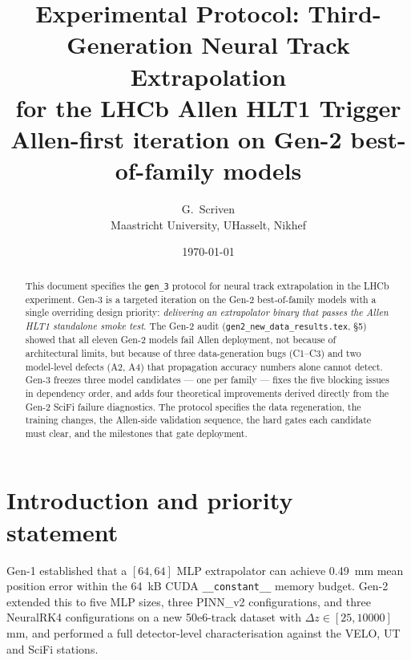 \documentclass[a4paper,11pt]{article}
\newcommand{\SI}[2]{#1~#2}
\newcommand{\num}[1]{#1}
\newcommand{\kilo}{k}
\newcommand{\byte}{B}
\newcommand{\mm}{mm}
\newcommand{\dz}{\Delta z}
\begin{document}
\title{Experimental Protocol: Third-Generation Neural Track Extrapolation\\
for the LHCb Allen HLT1 Trigger\\
\large Allen-first iteration on Gen-2 best-of-family models}

\author{G.~Scriven\\\small Maastricht University, UHasselt, Nikhef}
\date{\today}

\begin{abstract}
This document specifies the \texttt{gen\_3} protocol for neural track
extrapolation in the LHCb experiment.  Gen-3 is a targeted iteration on
the Gen-2 best-of-family models with a single overriding design
priority: \emph{delivering an extrapolator binary that passes the Allen
HLT1 standalone smoke test}.  The Gen-2 audit
(\texttt{gen2\_new\_data\_results.tex}, §5) showed that all eleven
Gen-2 models fail Allen deployment, not because of architectural
limits, but because of three data-generation bugs (C1--C3) and two
model-level defects (A2, A4) that propagation accuracy numbers alone
cannot detect.  Gen-3 freezes three model candidates --- one per
family --- fixes the five blocking issues in dependency order, and
adds four theoretical improvements derived directly from the Gen-2
SciFi failure diagnostics.  The protocol specifies the data
regeneration, the training changes, the Allen-side validation
sequence, the hard gates each candidate must clear, and the
milestones that gate deployment.
\end{abstract}

\maketitle

\section{Introduction and priority statement}\label{gen3:sec:intro}

Gen-1 established that a $[64,64]$ MLP extrapolator can achieve
\SI{0.49}{\mm} mean position error within the \SI{64}{\kilo\byte} CUDA
\texttt{\_\_constant\_\_} memory budget.  Gen-2 extended this to five
MLP sizes, three PINN\_v2 configurations, and three NeuralRK4
configurations on a new \num{50e6}-track dataset with $\dz \in
[25,10000]$\,mm, and performed a full detector-level
characterisation against the VELO, UT and SciFi stations.
\end{document}
